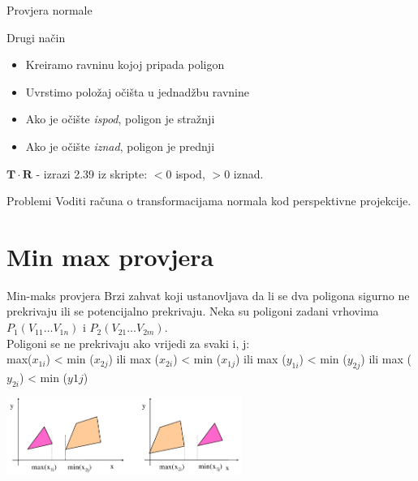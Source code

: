 \documentclass[9pt]{beamer}
\begin{document}
\begin{frame}{Provjera normale}
	\begin{block}{Drugi način}
		\begin{itemize}
			\item Kreiramo ravninu kojoj pripada poligon
			\item Uvrstimo položaj očišta u jednadžbu ravnine
			\item Ako je očište \textit{ispod}, poligon je stražnji
			\item Ako je očište \textit{iznad}, poligon je prednji
		\end{itemize}
	$\mathbf{T}\cdot \mathbf{R}$ - izrazi 2.39 iz skripte: $<0$ ispod, $>0$ iznad. 
	\end{block}
	
	\begin{block}{Problemi}
		Voditi računa o transformacijama normala kod perspektivne projekcije.
	\end{block}
\end{frame}


\section{Min max provjera}
\begin{frame}{Min-maks provjera}
	Brzi zahvat koji ustanovljava da li se dva poligona sigurno ne
	prekrivaju ili se potencijalno prekrivaju.
	Neka su poligoni zadani vrhovima $P_{1}(V_{11}\ldots V_{1n})$ i $P_{2}(V_{21}\ldots V_{2m})$.\\
	Poligoni se ne prekrivaju ako vrijedi za svaki i, j: \\
	max($x_{1i}$) < min ($x_{2j}$) ili \newline
	max ($x_{2i}$) < min ($x_{1j}$) ili\newline
	max ($y_{1i}$) < min ($y_{2j}$) ili\newline
	max ($y_{2i}$) < min ($y{1j}$)
	\begin{center}
		\includegraphics[height=2.5cm]{slike/04_minmax_1.png}
	\end{center}
\end{frame}
\end{document}
